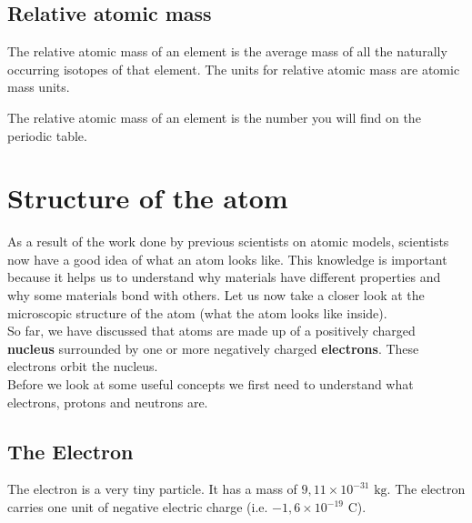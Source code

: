             \subsection*{Relative atomic mass}
            \nopagebreak

 {The relative atomic mass of an element is the average mass of all the naturally occurring isotopes of that element. The units for relative atomic mass are atomic mass units.} 

The relative atomic mass of an element is the number you will find on the periodic table.  
         \section{Structure of the atom}
    \nopagebreak
    \label{m38745*cid4}
            \nopagebreak
      \label{m38745*id255206}As a result of the work done by previous scientists on atomic models, scientists now have a good idea of what an atom looks like. This knowledge is important because it helps us to understand why materials have different properties and why some materials bond with others. Let us now take a closer look at the microscopic structure of the atom (what the atom looks like inside). \\ 
      \label{m38745*id255216}So far, we have discussed that atoms are made up of a positively charged \textbf{nucleus} surrounded by
one or more negatively charged \textbf{electrons}. These electrons orbit the nucleus.\\ 
      \label{m38745*eip-577}Before we look at some useful concepts we first need to understand what electrons, protons and neutrons are. \label{m38745*uid10}
            \subsection*{The Electron}
            \nopagebreak
The electron is a very tiny particle. It has a mass of $9,11 \times {10}^{-31} \text{ kg}$. The electron carries one unit of negative electric charge (i.e.\@{} $-1,6 \times 10^{-19} \text{ C}$).
      \label{m38745*uid11}
